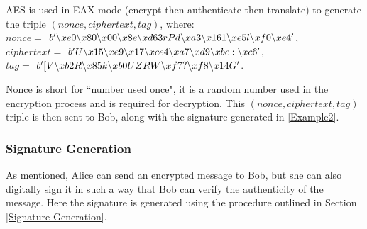\documentclass[12pt,a4paper]{article}
\begin{document}
AES is used in EAX mode (encrypt-then-authenticate-then-translate) to generate the triple $(nonce, ciphertext, tag)$, where: 
\vspace{1mm} \\
$nonce = $ {\footnotesize $b' \char`\\xe0 \char`\\x80 \char`\\x00 \char`\\x8e \char`\\xd63rPd \char`\\xa3 \char`\\x161 \char`\\xe5l \char`\\xf0 \char`\\xe4 '$}, \\
$ciphertext = $ {\footnotesize $b' U \char`\\x15 \char`\\xe9 \char`\\x17 \char`\\xce4 \char`\\xa7 \char`\\xd9 \char`\\xbc: \char`\\xc6 '$}, \\
$tag = $ {\footnotesize $b' [V \char`\\xb2R \char`\\x85k \char`\\xb0UZRW \char`\\xf7? \char`\\xf8 \char`\\x14G'$}. 

\vspace{1mm}

Nonce is short for ``number used once", it is a random number used in the encryption process and is required for decryption. 
This $(nonce, ciphertext, tag)$ triple is then sent to Bob, along with the signature generated in \ref{Example2}. 


\subsubsection{Signature Generation} \noindent \label{Example2}
As mentioned, Alice can send an encrypted message to Bob, 
but she can also digitally sign it in such a way that Bob can verify the authenticity of the message. 
Here the signature is generated using the procedure outlined in Section \ref{Signature Generation}. 
\end{document}
